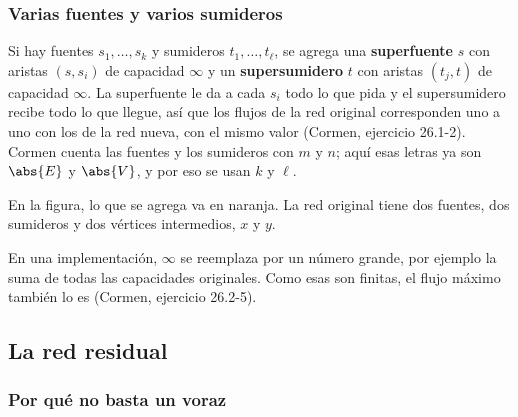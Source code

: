 \documentclass[11pt,letterpaper]{article}
\begin{document}
\subsubsection*{Varias fuentes y varios sumideros}

Si hay fuentes $s_1, \dots, s_k$ y sumideros $t_1, \dots, t_\ell$, se
agrega una \textbf{superfuente} $s$ con aristas $(s, s_i)$ de
capacidad $\infty$ y un \textbf{supersumidero} $t$ con aristas
$(t_j, t)$ de capacidad $\infty$. La superfuente le da a cada $s_i$
todo lo que pida y el supersumidero recibe todo lo que llegue, así que
los flujos de la red original corresponden uno a uno con los de la red
nueva, con el mismo valor (Cormen, ejercicio 26.1-2). Cormen cuenta
las fuentes y los sumideros con $m$ y $n$; aquí esas letras ya son
$\abs{E}$ y $\abs{V}$, y por eso se usan $k$ y $\ell$.

En la figura, lo que se agrega va en naranja. La red original tiene
dos fuentes, dos sumideros y dos vértices intermedios, $x$ y $y$.

\begin{center}
\end{center}

En una implementación, $\infty$ se reemplaza por un número grande, por
ejemplo la suma de todas las capacidades originales. Como esas son
finitas, el flujo máximo también lo es (Cormen, ejercicio 26.2-5).


\subsection*{La red residual}

\subsubsection*{Por qué no basta un voraz}
\end{document}
